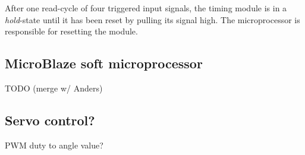 After one read-cycle of four triggered input signals, the timing module is in a \emph{hold}-state until it has been reset by pulling its  signal high.
The microprocessor is responsible for resetting the module.


\subsection{MicroBlaze soft microprocessor}
TODO (merge w/ Anders)

\subsection{Servo control?}
PWM duty to angle value?

